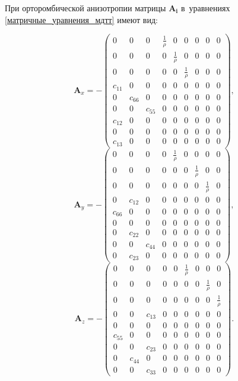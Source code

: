 \documentclass[thesis.tex]{subfiles}
\begin{document}
При орторомбической анизотропии матрицы $\mathbf{A_i}$ в~уравнениях \eqref{матричные_уравнения_мдтт} имеют вид:
\begin{small}
\[
    \mathbf{A}_x = -\begin{pmatrix}
    0 & 0 & 0 & \frac 1 \rho & 0 & 0 & 0 & 0 & 0 \\
    0 & 0 & 0 & 0 & \frac 1 \rho & 0 & 0 & 0 & 0 \\
    0 & 0 & 0 & 0 & 0 & \frac 1 \rho & 0 & 0 & 0 \\
    c_{11} & 0 & 0 & 0 & 0 & 0 & 0 & 0 & 0 \\
    0 & c_{66} & 0 & 0 & 0 & 0 & 0 & 0 & 0 \\
    0 & 0 & c_{55} & 0 & 0 & 0 & 0 & 0 & 0 \\
    c_{12} & 0 & 0 & 0 & 0 & 0 & 0 & 0 & 0 \\
    0 & 0 & 0 & 0 & 0 & 0 & 0 & 0 & 0 \\
    c_{13} & 0 & 0 & 0 & 0 & 0 & 0 & 0 & 0
    \end{pmatrix},
\]
\[
    \mathbf{A}_y = -\begin{pmatrix}
    0 & 0 & 0 & 0 & \frac 1 \rho & 0 & 0 & 0 & 0 \\
    0 & 0 & 0 & 0 & 0 & 0 & \frac 1 \rho & 0 & 0 \\
    0 & 0 & 0 & 0 & 0 & 0 & 0 & \frac 1 \rho & 0 \\
    0 & c_{12} & 0 & 0 & 0 & 0 & 0 & 0 & 0 \\
    c_{66} & 0 & 0 & 0 & 0 & 0 & 0 & 0 & 0 \\
    0 & 0 & 0 & 0 & 0 & 0 & 0 & 0 & 0 \\
    0 & c_{22} & 0 & 0 & 0 & 0 & 0 & 0 & 0 \\
    0 & 0 & c_{44} & 0 & 0 & 0 & 0 & 0 & 0 \\
    0 & c_{23} & 0 & 0 & 0 & 0 & 0 & 0 & 0
    \end{pmatrix},
\]
\[
    \mathbf{A}_z = -\begin{pmatrix}
    0 & 0 & 0 & 0 & 0 & \frac 1 \rho & 0 & 0 & 0 \\
    0 & 0 & 0 & 0 & 0 & 0 & 0 & \frac 1 \rho & 0 \\
    0 & 0 & 0 & 0 & 0 & 0 & 0 & 0 & \frac 1 \rho \\
    0 & 0 & c_{13} & 0 & 0 & 0 & 0 & 0 & 0 \\
    0 & 0 & 0 & 0 & 0 & 0 & 0 & 0 & 0 \\
    c_{55} & 0 & 0 & 0 & 0 & 0 & 0 & 0 & 0 \\
    0 & 0 & c_{23} & 0 & 0 & 0 & 0 & 0 & 0 \\
    0 & c_{44} & 0 & 0 & 0 & 0 & 0 & 0 & 0 \\
    0 & 0 & c_{33} & 0 & 0 & 0 & 0 & 0 & 0
    \end{pmatrix}.
\]
\end{small}
\end{document}
